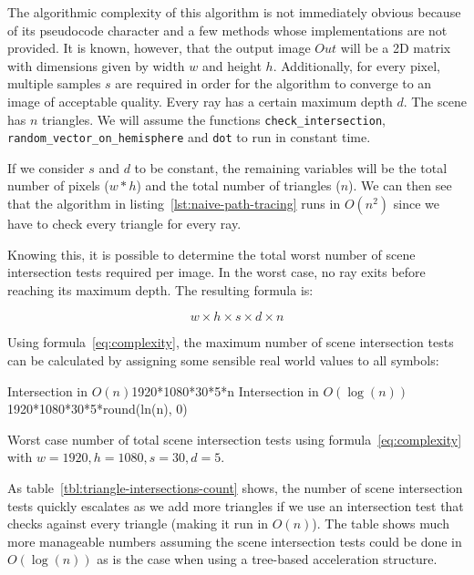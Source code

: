 \documentclass[
  twoside,
  11pt, a4paper,
  footinclude=true,
  headinclude=true,
  cleardoublepage=empty
]{scrreprt}
\begin{document}
\vspace{0.5cm}

The algorithmic complexity of this algorithm is not immediately obvious because of its pseudocode
character and a few methods whose implementations are not provided. It is known, however, that
the output image \(Out\) will be a 2D matrix with dimensions given by width \(w\) and height \(h\).
Additionally, for every pixel, multiple samples \(s\) are required in order for the algorithm to
converge to an image of acceptable quality. Every ray has a certain maximum depth \(d\).
The scene has \(n\) triangles. We will assume the functions \texttt{check\_intersection},
\texttt{random\_vector\_on\_hemisphere} and \texttt{dot} to run in constant time.

If we consider \(s\) and \(d\) to be constant, the remaining variables will be the total number of
pixels (\(w * h\)) and the total number of triangles (\(n\)). We can then see that the algorithm in
listing~\ref{lst:naive-path-tracing} runs in \(O(n^2)\) since we have to check every triangle for
every ray.

Knowing this, it is possible to determine the total worst number of scene intersection tests required per image.
In the worst case, no ray exits before reaching its maximum depth. The resulting formula is:

\begin{equation}\label{eq:complexity}
    w \times h \times s \times d \times n
\end{equation}

Using formula~\ref{eq:complexity}, the maximum number of scene intersection tests can be calculated
by assigning some sensible real world values to all symbols:

\begin{table}[H]
    \centering
                  {Intersection in \(O(n)\)}{1920*1080*30*5*n}
                  {Intersection in \(O(\log(n))\)}{1920*1080*30*5*round(ln(n), 0)}
    \caption{Worst case number of total scene intersection tests using
    formula~\ref{eq:complexity} with \(w=1920, h=1080, s=30, d=5\).}
    \label{tbl:triangle-intersections-count}
\end{table}

As table~\ref{tbl:triangle-intersections-count} shows, the number of scene intersection tests
quickly escalates as we add more triangles if we use an intersection test that checks
against every triangle (making it run in \(O(n)\)). The table shows much more manageable numbers assuming
the scene intersection tests could be done in \(O(\log(n))\) as is the case when using a tree-based
acceleration structure.
\end{document}
